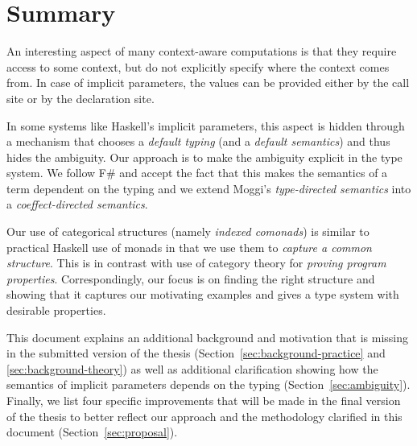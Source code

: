 \documentclass[
		twoside,openright,titlepage,numbers=noenddot,headinclude,%
                footinclude=true,cleardoublepage=empty,
                BCOR=10mm,paper=a4,fontsize=10pt, %
                ngerman,american, %
                ]{scrreprt}
\begin{document}

\section{Summary}

An interesting aspect of many context-aware computations is that they require access to some
context, but do not explicitly specify where the context comes from. In case of implicit parameters,
the values can be provided either by the call site or by the declaration site.

In some systems like Haskell's implicit parameters, this aspect is hidden through a mechanism that
chooses a \emph{default typing} (and a \emph{default semantics}) and thus hides the ambiguity. Our approach is
to make the ambiguity explicit in the type system. We follow F\# and accept the fact that this
makes the semantics of a term dependent on the typing and we extend Moggi's \emph{type-directed
semantics} into a \emph{coeffect-directed semantics}.

Our use of categorical structures (namely \emph{indexed comonads}) is similar to practical Haskell
use of monads in that we use them to \emph{capture a common structure}. This is in contrast with
use of category theory for \emph{proving program properties}. Correspondingly, our focus is on
finding the right structure and showing that it captures our motivating examples and gives a type
system with desirable properties.

This document explains an additional background and motivation that is missing in the submitted
version of the thesis (Section~\ref{sec:background-practice} and \ref{sec:background-theory}) as
well as additional clarification showing how the semantics of implicit parameters depends on the
typing (Section~\ref{sec:ambiguity}). Finally, we list four specific improvements that will be
made in the final version of the thesis to better reflect our approach and the methodology
clarified in this document (Section~\ref{sec:proposal}).



\end{document}
